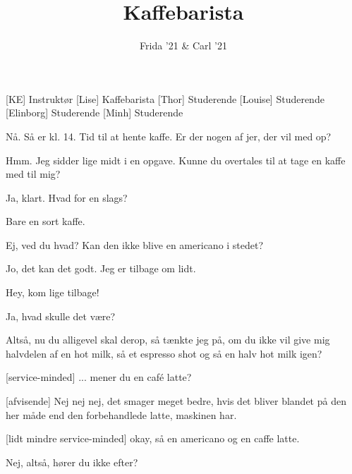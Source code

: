 \documentclass[a4paper,11pt]{article}
\title{Kaffebarista}
\author{Frida '21 \& Carl '21}
\begin{document}
\maketitle

\begin{roles}
[KE] Instruktør
[Lise] Kaffebarista
[Thor] Studerende
[Louise] Studerende
[Elinborg] Studerende
[Minh] Studerende
\end{roles}

\begin{sketch}

 Nå. Så er kl. 14. Tid til at hente kaffe. Er der nogen af jer, der vil med op?

 Hmm. Jeg sidder lige midt i en opgave. Kunne du overtales til at tage en kaffe med til mig?

 Ja, klart. Hvad for en slags?

 Bare en sort kaffe.


 Ej, ved du hvad? Kan den ikke blive en americano i stedet?


 Jo, det kan det godt. Jeg er tilbage om lidt.

 Hey, kom lige tilbage!


 Ja, hvad skulle det være?



 Altså, nu du alligevel skal derop, så tænkte jeg på, om du ikke vil give mig halvdelen af en hot milk, så et espresso shot og så en halv hot milk igen?

[service-minded] ... mener du en café latte?

[afvisende] Nej nej nej, det smager meget bedre, hvis det bliver blandet på den her måde end den forbehandlede latte, maskinen har.

[lidt mindre service-minded] okay, så en americano og en caffe latte.

 Nej, altså, hører du ikke efter?


\end{sketch}
\end{document}
